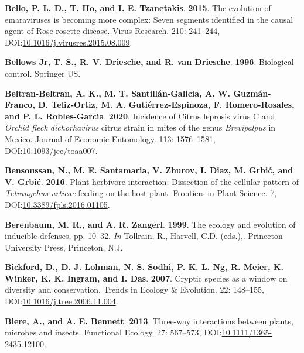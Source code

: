 \documentclass[12pt,final,CPage]{ufthesis}
\newlength{\cslhangindent}
\newenvironment{CSLReferences}[2] %
{%
	\setlength{\parindent}{0pt}
	\ifodd #1 \everypar{\setlength{\hangindent}{\cslhangindent}}\ignorespaces\fi
	\ifnum #2 > 0
	\setlength{\parskip}{#2\baselineskip}
	\fi
}%
{}
\begin{document}
{\begin{CSLReferences}{1}{0}
  \leavevmode{}%
  \textbf{Bello, P. L. D., T. Ho, and I. E. Tzanetakis}. \textbf{2015}. The evolution of emaraviruses is becoming more complex: Seven segments identified in the causal agent of {Rose rosette disease}. Virus Research. 210: 241--244, DOI:\href{https://doi.org/10.1016/j.virusres.2015.08.009}{10.1016/j.virusres.2015.08.009}.

  \leavevmode{}%
  \textbf{Bellows Jr, T. S., R. V. Driesche, and R. van Driesche}. \textbf{1996}. Biological control. Springer US.

  \leavevmode{}%
  \textbf{Beltran-Beltran, A. K., M. T. Santillán-Galicia, A. W. Guzmán-Franco, D. Teliz-Ortiz, M. A. Gutiérrez-Espinoza, F. Romero-Rosales, and P. L. Robles-Garcı́a}. \textbf{2020}. Incidence of {Citrus leprosis virus} {C} and {\emph{Orchid fleck dichorhavirus}} citrus strain in mites of the genus {\emph{Brevipalpus}} in {Mexico}. Journal of Economic Entomology. 113: 1576--1581, DOI:\href{https://doi.org/10.1093/jee/toaa007}{10.1093/jee/toaa007}.

  \leavevmode{}%
  \textbf{Bensoussan, N., M. E. Santamaria, V. Zhurov, I. Diaz, M. Grbić, and V. Grbić}. \textbf{2016}. Plant-herbivore interaction: Dissection of the cellular pattern of {\emph{Tetranychus urticae}} feeding on the host plant. Frontiers in Plant Science. 7, DOI:\href{https://doi.org/10.3389/fpls.2016.01105}{10.3389/fpls.2016.01105}.

  \leavevmode{}%
  \textbf{Berenbaum, M. R., and A. R. Zangerl}. \textbf{1999}. The ecology and evolution of inducible defenses, pp. 10--32. \emph{In} Tollrain, R., Harvell, C.D. (eds.),. Princeton University Press, Princeton, N.J.

  \leavevmode{}%
  \textbf{Bickford, D., D. J. Lohman, N. S. Sodhi, P. K. L. Ng, R. Meier, K. Winker, K. K. Ingram, and I. Das}. \textbf{2007}. Cryptic species as a window on diversity and conservation. Trends in Ecology {\&} Evolution. 22: 148--155, DOI:\href{https://doi.org/10.1016/j.tree.2006.11.004}{10.1016/j.tree.2006.11.004}.

  \leavevmode{}%
  \textbf{Biere, A., and A. E. Bennett}. \textbf{2013}. Three-way interactions between plants, microbes and insects. Functional Ecology. 27: 567--573, DOI:\href{https://doi.org/10.1111/1365-2435.12100}{10.1111/1365-2435.12100}.


\end{CSLReferences}}
\end{document}

